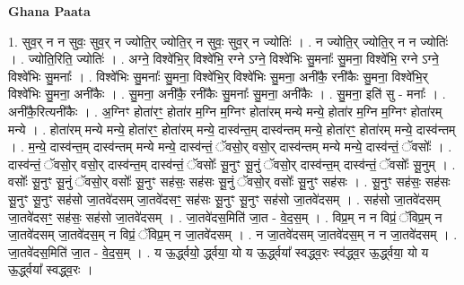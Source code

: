 \documentclass[17pt]{extarticle}
\begin{document}
\textbf{Ghana Paata } \newline

1. सुव॒र् न न सुवः॒ सुव॒र् न ज्योति॒र् ज्योति॒र् न सुवः॒ सुव॒र् न ज्योतिः॑ । . न ज्योति॒र् ज्योति॒र् न न ज्योतिः॑ । . ज्योति॒रिति॒ ज्योतिः॑ । . अग्ने॒ विश्वे॑भि॒र् विश्वे॑भि॒ रग्ने ऽग्ने॒ विश्वे॑भिः सु॒मनाः᳚ सु॒मना॒ विश्वे॑भि॒ रग्ने ऽग्ने॒ विश्वे॑भिः सु॒मनाः᳚ । . विश्वे॑भिः सु॒मनाः᳚ सु॒मना॒ विश्वे॑भि॒र् विश्वे॑भिः सु॒मना॒ अनी॑कै॒ रनी॑कैः सु॒मना॒ विश्वे॑भि॒र् विश्वे॑भिः सु॒मना॒ अनी॑कैः । . सु॒मना॒ अनी॑कै॒ रनी॑कैः सु॒मनाः᳚ सु॒मना॒ अनी॑कैः । . सु॒मना॒ इति॑ सु - मनाः᳚ । . अनी॑कै॒रित्यनी॑कैः । . अ॒ग्निꣳ होता॑रꣳ॒॒ होता॑र म॒ग्नि म॒ग्निꣳ होता॑रम् मन्ये मन्ये॒ होता॑र म॒ग्नि म॒ग्निꣳ होता॑रम् मन्ये । . होता॑रम् मन्ये मन्ये॒ होता॑रꣳ॒॒ होता॑रम् मन्ये॒ दास्व॑न्त॒म् दास्व॑न्तम् मन्ये॒ होता॑रꣳ॒॒ होता॑रम् मन्ये॒ दास्व॑न्तम् । . म॒न्ये॒ दास्व॑न्त॒म् दास्व॑न्तम् मन्ये मन्ये॒ दास्व॑न्तं॒ ॅवसो॒र् वसो॒र् दास्व॑न्तम् मन्ये मन्ये॒ दास्व॑न्तं॒ ॅवसोः᳚ । . दास्व॑न्तं॒ ॅवसो॒र् वसो॒र् दास्व॑न्त॒म् दास्व॑न्तं॒ ॅवसोः᳚ सू॒नुꣳ सू॒नुं ॅवसो॒र् दास्व॑न्त॒म् 
दास्व॑न्तं॒ ॅवसोः᳚ सू॒नुम् । . वसोः᳚ सू॒नुꣳ सू॒नुं ॅवसो॒र् वसोः᳚ सू॒नुꣳ सह॑सः॒ सह॑सः सू॒नुं ॅवसो॒र् वसोः᳚ सू॒नुꣳ सह॑सः । . सू॒नुꣳ सह॑सः॒ सह॑सः सू॒नुꣳ सू॒नुꣳ सह॑सो जा॒तवे॑दसम् जा॒तवे॑दसꣳ॒॒ सह॑सः सू॒नुꣳ 
सू॒नुꣳ सह॑सो जा॒तवे॑दसम् । . सह॑सो जा॒तवे॑दसम् जा॒तवे॑दसꣳ॒॒ सह॑सः॒ सह॑सो जा॒तवे॑दसम् । . जा॒तवे॑दस॒मिति॑ जा॒त - वे॒द॒स॒म् । . विप्र॒म् न न विप्रं॒ ॅविप्र॒म् न जा॒तवे॑दसम् जा॒तवे॑दस॒म् न विप्रं॒ ॅविप्र॒म् न जा॒तवे॑दसम् । . न जा॒तवे॑दसम् जा॒तवे॑दस॒म् न न जा॒तवे॑दसम् । . जा॒तवे॑दस॒मिति॑ जा॒त - वे॒द॒स॒म् । . य ऊ॒र्द्ध्वयो॒ र्द्ध्वया॒ यो य ऊ॒र्द्ध्वया᳚ स्वद्ध्व॒रः स्व॑द्ध्व॒र ऊ॒र्द्ध्वया॒ यो य ऊ॒र्द्ध्वया᳚ स्वद्ध्व॒रः । \newline
\end{document}
